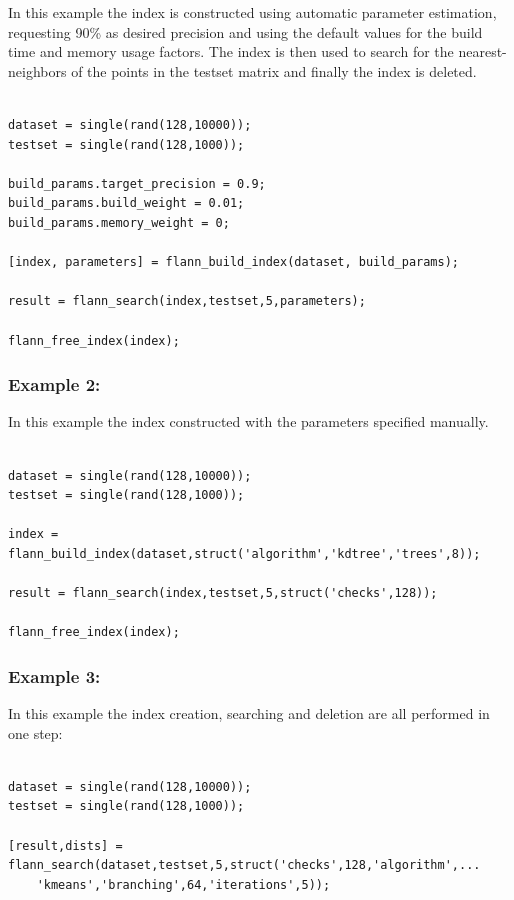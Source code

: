 \documentclass[letter,10pt]{article}
\begin{document}
In this example the index is constructed using automatic parameter estimation, requesting 90\% as desired precision and using the default values for the build time and memory usage factors. The index is then used to search for the nearest-neighbors of the points in the testset matrix and finally the index is deleted.

\begin{Verbatim}[fontsize=\footnotesize,frame=single]

dataset = single(rand(128,10000));
testset = single(rand(128,1000));

build_params.target_precision = 0.9;
build_params.build_weight = 0.01;
build_params.memory_weight = 0;

[index, parameters] = flann_build_index(dataset, build_params);

result = flann_search(index,testset,5,parameters);

flann_free_index(index);

\end{Verbatim}




% 
% 


\subsubsection{Example 2:}

In this example the index constructed with the parameters specified manually.

\begin{Verbatim}[fontsize=\footnotesize,frame=single]

dataset = single(rand(128,10000));
testset = single(rand(128,1000));

index = flann_build_index(dataset,struct('algorithm','kdtree','trees',8));

result = flann_search(index,testset,5,struct('checks',128));

flann_free_index(index);

\end{Verbatim}

\subsubsection{Example 3:}

In this example the index creation, searching and deletion are all performed in one step:

\begin{Verbatim}[fontsize=\footnotesize,frame=single]

dataset = single(rand(128,10000));
testset = single(rand(128,1000));

[result,dists] = flann_search(dataset,testset,5,struct('checks',128,'algorithm',...
    'kmeans','branching',64,'iterations',5));

\end{Verbatim}
\end{document}
